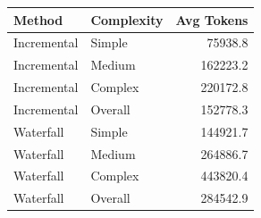 \begin{tabular}{llr}
\toprule
Method & Complexity & Avg Tokens \\
\midrule
Incremental & Simple & 75938.8 \\
Incremental & Medium & 162223.2 \\
Incremental & Complex & 220172.8 \\
Incremental & Overall & 152778.3 \\
Waterfall & Simple & 144921.7 \\
Waterfall & Medium & 264886.7 \\
Waterfall & Complex & 443820.4 \\
Waterfall & Overall & 284542.9 \\
\bottomrule
\end{tabular}

